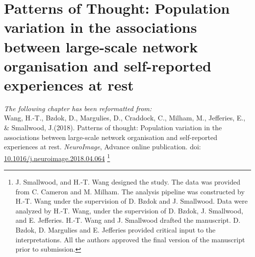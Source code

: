 \chapter{Patterns of Thought: Population variation in the associations between large-scale network organisation and self-reported experiences at rest}
\label{ch:study2}

\textit{The following chapter has been reformatted from:\\}
Wang, H.-T., Bzdok, D., Margulies, D., Craddock, C., Milham, M., Jefferies, E., \& Smallwood, J.(2018). 
Patterns of thought: Population variation in the associations between large-scale network organisation and self-reported experiences at rest. 
\textit{NeuroImage}, Advance online publication. doi: \url{10.1016/j.neuroimage.2018.04.064}
\footnote{
J. Smallwood, and H.-T. Wang designed the study. The data was provided from C. Cameron and M. Milham. The analysis pipeline was constructed by H.-T. Wang under the supervision of D. Bzdok and J. Smallwood. Data were analyzed by H.-T. Wang, under the supervision of D. Bzdok, J. Smallwood, and E. Jefferies. H.-T. Wang and J. Smallwood drafted the manuscript. D. Bzdok, D. Margulies and E. Jefferies provided critical input to the interpretations. All the authors approved the final version of the manuscript prior to submission.}
\\


\newpage

